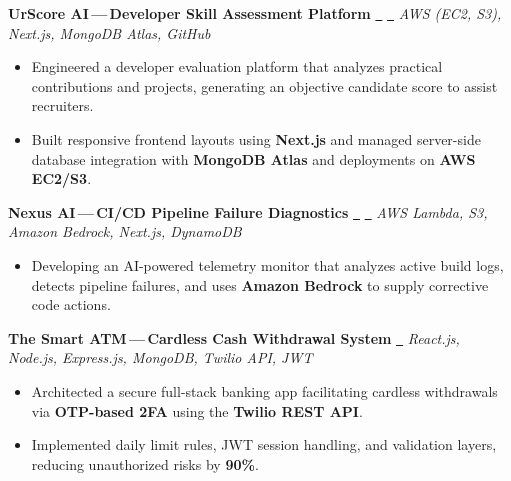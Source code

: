 \documentclass[a4paper,9pt]{article}
\begin{document}
{\small

\noindent
\textbf{UrScore AI\,---\,Developer Skill Assessment Platform}\;
\href{https://github.com/DEVARAJ-07/UrScore-AI}{\faGithub\ } \;\; \href{https://urscore-ai.vercel.app}{\faGlobe\ }
\hfill
\textit{AWS (EC2, S3), Next.js, MongoDB Atlas, GitHub}

\begin{itemize}[leftmargin=1em, itemsep=1pt, nosep]
  \item Engineered a developer evaluation platform that analyzes practical contributions and projects, generating an objective candidate score to assist recruiters.
  \item Built responsive frontend layouts using \textbf{Next.js} and managed server-side database integration with \textbf{MongoDB Atlas} and deployments on \textbf{AWS EC2/S3}.
\end{itemize}

\vspace{3pt}

\noindent
\textbf{Nexus AI\,---\,CI/CD Pipeline Failure Diagnostics}\;
\href{https://github.com/DEVARAJ-07/Nexus-AI}{\faGithub\ } \;\; \href{https://nexus-cicd-ai.vercel.app}{\faGlobe\ }
\hfill
\textit{AWS Lambda, S3, Amazon Bedrock, Next.js, DynamoDB}

\begin{itemize}[leftmargin=1em, itemsep=1pt, nosep]
  \item Developing an AI-powered telemetry monitor that analyzes active build logs, detects pipeline failures, and uses \textbf{Amazon Bedrock} to supply corrective code actions.
\end{itemize}

\vspace{3pt}

\noindent
\textbf{The Smart ATM\,---\,Cardless Cash Withdrawal System}\;
\href{https://github.com/DEVARAJ-07/SmartATM}{\faGithub\ }
\hfill
\textit{React.js, Node.js, Express.js, MongoDB, Twilio API, JWT}

\begin{itemize}[leftmargin=1em, itemsep=1pt, nosep]
  \item Architected a secure full-stack banking app facilitating cardless withdrawals via \textbf{OTP-based 2FA} using the \textbf{Twilio REST API}.
  \item Implemented daily limit rules, JWT session handling, and validation layers, reducing unauthorized risks by \textbf{90\%}.
\end{itemize}

}
\end{document}
